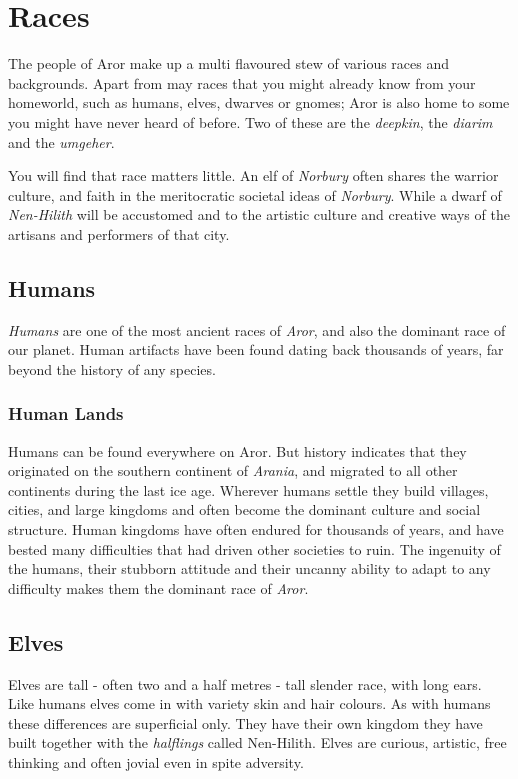 \twocolumn
\section*{Races}

The people of Aror make up a multi flavoured stew of various races and
backgrounds. Apart from may races that you might already know from your
homeworld, such as humans, elves, dwarves or gnomes; Aror is also home to some
you might have never heard of before. Two of these are the \emph{deepkin}, the
\emph{diarim} and the \emph{umgeher}.

You will find that race matters little. An elf of \emph{Norbury} often shares
the warrior culture, and faith in the meritocratic societal ideas
of \emph{Norbury}. While a dwarf of \emph{Nen-Hilith} will be accustomed and
to the artistic culture and creative ways of the artisans and performers of
that city.

\subsection*{Humans}

\emph{Humans} are one of the most ancient races of \emph{Aror}, and also the
dominant race of our planet. Human artifacts have been found dating back
thousands of years, far beyond the history of any species.

\subsubsection*{Human Lands}

Humans can be found everywhere on Aror. But history indicates that they
originated on the southern continent of \emph{Arania}, and migrated to all
other continents during the last ice age. Wherever humans settle they build
villages, cities, and large kingdoms and often become the dominant culture and
social structure. Human kingdoms have often endured for thousands of years,
and have bested many difficulties that had driven other societies to ruin.
The ingenuity of the humans, their stubborn attitude and their uncanny ability
to adapt to any difficulty makes them the dominant race of \emph{Aror}.

\subsection*{Elves}

Elves are tall - often two and a half metres - tall slender race, with long
ears. Like humans elves come in with variety skin and hair colours.  As with
humans these differences are superficial only. They have their own kingdom
they have built together with the \emph{halflings} called Nen-Hilith. Elves
are curious, artistic, free thinking and often jovial even in spite
adversity.

